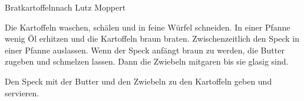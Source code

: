 \begin{recipe}{Bratkartoffeln}{nach Lutz Moppert}
  \inglist
  
  \steps
  Die Kartoffeln waschen, schälen und in feine Würfel schneiden. In einer Pfanne wenig Öl
  erhitzen und die Kartoffeln braun braten. Zwischenzeitlich den Speck in einer Pfanne
  auslassen. Wenn der Speck anfängt braun zu werden, die Butter zugeben und schmelzen
  lassen. Dann die Zwiebeln mitgaren bis sie glasig sind.

  Den Speck mit der Butter und den Zwiebeln zu den Kartoffeln geben und servieren.
\end{recipe}
